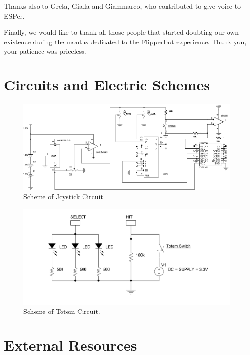 \documentclass[a4paper,twoside]{book}
\begin{document}
Thanks also to Greta, Giada and Giammarco, who contributed to give voice to ESPer.

Finally, we would like to thank all those people that started doubting our own existence during the months dedicated to the FlipperBot experience. Thank you, your patience was priceless.

\begin{appendices}

\chapter{Circuits and Electric Schemes}
\label{app:circuit}

\begin{figure}[h]
\includegraphics[width=\linewidth]{img/ControllerCircuitry_bw} 
\caption{Scheme of Joystick Circuit.}
\end{figure}

\begin{figure}[h]
\includegraphics[width=\linewidth]{img/Totem_bw} 
\caption{Scheme of Totem Circuit.}
\end{figure}

\chapter{External Resources}
\label{app:external}


\end{appendices}
\end{document}
